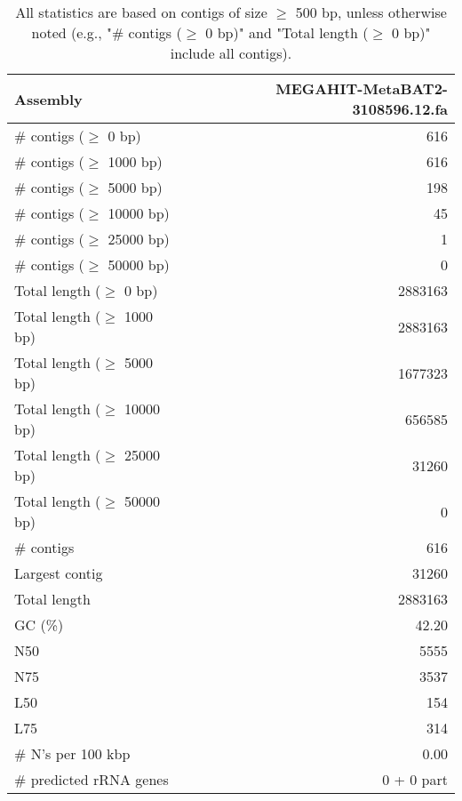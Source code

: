 \documentclass[12pt,a4paper]{article}
\begin{document}
\begin{table}[ht]
\begin{center}
\caption{All statistics are based on contigs of size $\geq$ 500 bp, unless otherwise noted (e.g., "\# contigs ($\geq$ 0 bp)" and "Total length ($\geq$ 0 bp)" include all contigs).}
\begin{tabular}{|l*{1}{|r}|}
\hline
Assembly & MEGAHIT-MetaBAT2-3108596.12.fa \\ \hline
\# contigs ($\geq$ 0 bp) & 616 \\ \hline
\# contigs ($\geq$ 1000 bp) & 616 \\ \hline
\# contigs ($\geq$ 5000 bp) & 198 \\ \hline
\# contigs ($\geq$ 10000 bp) & 45 \\ \hline
\# contigs ($\geq$ 25000 bp) & 1 \\ \hline
\# contigs ($\geq$ 50000 bp) & 0 \\ \hline
Total length ($\geq$ 0 bp) & 2883163 \\ \hline
Total length ($\geq$ 1000 bp) & 2883163 \\ \hline
Total length ($\geq$ 5000 bp) & 1677323 \\ \hline
Total length ($\geq$ 10000 bp) & 656585 \\ \hline
Total length ($\geq$ 25000 bp) & 31260 \\ \hline
Total length ($\geq$ 50000 bp) & 0 \\ \hline
\# contigs & 616 \\ \hline
Largest contig & 31260 \\ \hline
Total length & 2883163 \\ \hline
GC (\%) & 42.20 \\ \hline
N50 & 5555 \\ \hline
N75 & 3537 \\ \hline
L50 & 154 \\ \hline
L75 & 314 \\ \hline
\# N's per 100 kbp & 0.00 \\ \hline
\# predicted rRNA genes & 0 + 0 part \\ \hline
\end{tabular}
\end{center}
\end{table}
\end{document}
